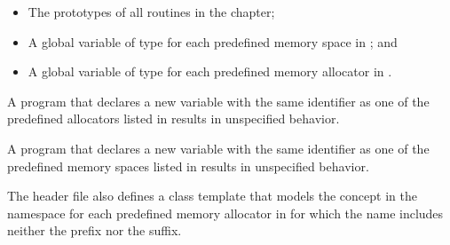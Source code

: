 \begin{ccppspecific}
\begin{itemize}
\item The prototypes of all routines in the chapter;
\item A global variable of type  for each 
      predefined memory space in ; and
\item A global variable of type  for each 
      predefined memory allocator in .
\end{itemize}

A program that declares a new variable with the same identifier as one of 
the predefined allocators listed in  
results in unspecified behavior.

A program that declares a new variable with the same identifier as one of 
the predefined memory spaces listed in  
results in unspecified behavior.
\end{ccppspecific}

\begin{cppspecific}
The  header file also defines a class template that
models the  concept in the 
namespace for each predefined memory allocator in
 for which the name includes
neither the  prefix nor the  suffix.
\end{cppspecific}

